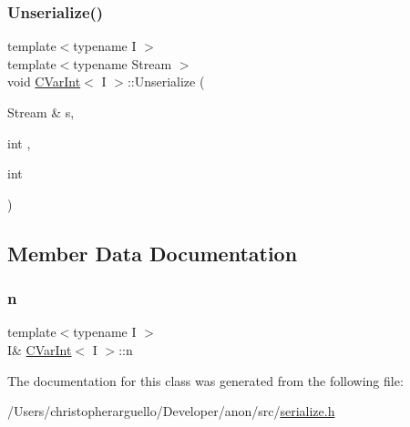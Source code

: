 \subsubsection{\texorpdfstring{Unserialize()}{Unserialize()}}
{\footnotesize\ttfamily template$<$typename I $>$ \\
template$<$typename Stream $>$ \\
void \mbox{\hyperlink{class_c_var_int}{C\+Var\+Int}}$<$ I $>$\+::Unserialize (\begin{DoxyParamCaption}\item[{Stream \&}]{s,  }\item[{int}]{,  }\item[{int}]{ }\end{DoxyParamCaption})\hspace{0.3cm}{\ttfamily [inline]}}



\subsection{Member Data Documentation}
\mbox{\label{class_c_var_int_a4514adc82b41754d9ac22ee627744614}} 
\subsubsection{\texorpdfstring{n}{n}}
{\footnotesize\ttfamily template$<$typename I $>$ \\
I\& \mbox{\hyperlink{class_c_var_int}{C\+Var\+Int}}$<$ I $>$\+::n\hspace{0.3cm}{\ttfamily [protected]}}



The documentation for this class was generated from the following file\+:\begin{DoxyCompactItemize}
\item 
/\+Users/christopherarguello/\+Developer/anon/src/\mbox{\hyperlink{serialize_8h}{serialize.\+h}}\end{DoxyCompactItemize}
